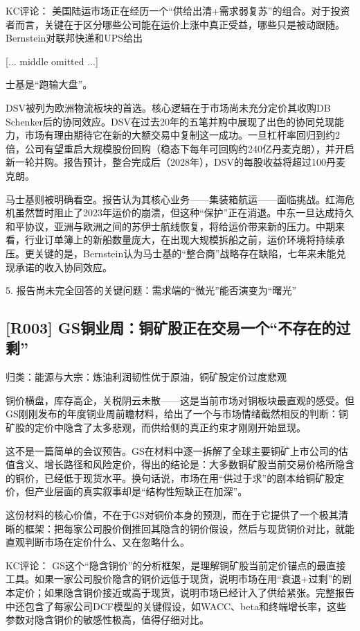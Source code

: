 \documentclass[11pt]{ctexart}
\begin{document}
KC评论： 美国陆运市场正在经历一个“供给出清+需求弱复苏”的组合。对于投资者而言，关键在于区分哪些公司能在运价上涨中真正受益，哪些只是被动跟随。Bernstein对联邦快递和UPS给出

[... middle omitted ...]

士基是“跑输大盘”。

DSV被列为欧洲物流板块的首选。核心逻辑在于市场尚未充分定价其收购DB Schenker后的协同效应。DSV在过去20年的五笔并购中展现了出色的协同兑现能力，市场有理由期待它在新的大额交易中复制这一成功。一旦杠杆率回归到约2倍，公司有望重启大规模股份回购（稳态下每年可回购约240亿丹麦克朗），并开启新一轮并购。报告预计，整合完成后（2028年），DSV的每股收益将超过100丹麦克朗。

马士基则被明确看空。报告认为其核心业务——集装箱航运——面临挑战。红海危机虽然暂时阻止了2023年运价的崩溃，但这种“保护”正在消退。中东一旦达成持久和平协议，亚洲与欧洲之间的苏伊士航线恢复，将给运价带来新的压力。中期来看，行业订单簿上的新船数量庞大，在出现大规模拆船之前，运价环境将持续承压。更关键的是，Bernstein认为马士基的“整合商”战略存在缺陷，七年来未能兑现承诺的收入协同效应。

5. 报告尚未完全回答的关键问题：需求端的“微光”能否演变为“曙光”

\subsection{[R003] GS铜业周：铜矿股正在交易一个“不存在的过剩”}
{\small\color{refgray}归类：能源与大宗：炼油利润韧性优于原油，铜矿股定价过度悲观}

铜价横盘，库存高企，关税阴云未散——这是当前市场对铜板块最直观的感受。但GS刚刚发布的年度铜业周前瞻材料，给出了一个与市场情绪截然相反的判断：铜矿股的定价中隐含了太多悲观，而供给侧的真正约束才刚刚开始显现。

这不是一篇简单的会议预告。GS在材料中逐一拆解了全球主要铜矿上市公司的估值含义、增长路径和风险定价，得出的结论是：大多数铜矿股当前交易价格所隐含的铜价，已经低于现货水平。换句话说，市场在用“供过于求”的剧本给铜矿股定价，但产业层面的真实叙事却是“结构性短缺正在加深”。

这份材料的核心价值，不在于GS对铜价本身的预测，而在于它提供了一个极其清晰的框架：把每家公司股价倒推回其隐含的铜价假设，然后与现货铜价对比，就能直观判断市场在定价什么、又在忽略什么。

KC评论： GS这个“隐含铜价”的分析框架，是理解铜矿股当前定价锚点的最直接工具。如果一家公司股价隐含的铜价远低于现货，说明市场在用“衰退+过剩”的剧本定价；如果隐含铜价接近或高于现货，说明市场已经计入了供给紧张。完整报告中还包含了每家公司DCF模型的关键假设，如WACC、beta和终端增长率，这些参数对隐含铜价的敏感性极高，值得仔细对比。
\end{document}

